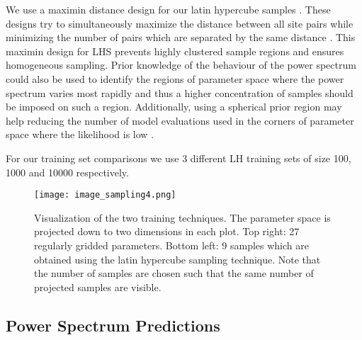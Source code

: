 \documentclass[useAMS,usenatbib]{mnras}
\begin{document}
We use a maximin distance design for our latin hypercube samples \citep{Morris1995a}. 
These designs try to simultaneously maximize the distance between all site pairs while minimizing the number of pairs which are separated by the same distance \citep{Moore1990a}.
This maximin design for LHS prevents highly clustered sample regions and ensures homogeneous sampling.
Prior knowledge of the behaviour of the power spectrum could also be used to identify the regions of parameter space where the power spectrum varies most rapidly and thus a higher concentration  of samples should be imposed on such a region.
Additionally, using a spherical prior region may help reducing the number of model evaluations used in the corners of parameter space where the likelihood is low \citep{Kern2017}.

For our training set comparisons we use 3 different LH training sets of size 100, 1000 and 10000 respectively.

\begin{figure}
\texttt{[image: image\_sampling4.png]}
\caption{Visualization of the two training techniques. The parameter space is projected down to two dimensions in each plot. Top right: 27 regularly gridded parameters. Bottom left: 9 samples which are obtained using the latin hypercube sampling technique.
Note that the number of samples are chosen such that the same number of projected samples are visible.}
\label{fig: sampling}
\end{figure}


\subsection{Power Spectrum Predictions}
\end{document}
